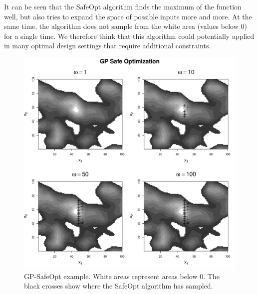 \documentclass[authoryear,11pt,review]{elsarticle}
\begin{document}
It can be seen that the SafeOpt algorithm finds the maximum of the function well, but also tries to expand the space of possible inputs more and more. At the same time, the algorithm does not sample from the white area (values below 0) for a single time. We therefore think that this algorithm could potentially applied in many optimal design settings that require additional constraints.
\begin{figure}[ht]
\caption{GP-SafeOpt example. White areas represent areas below 0. The black crosses show where the SafeOpt algorithm has sampled.}
\label{safeopt}
   \includegraphics[scale=0.5]{figs/safeoptimization.pdf}
\end{figure}
\FloatBarrier
\end{document}

